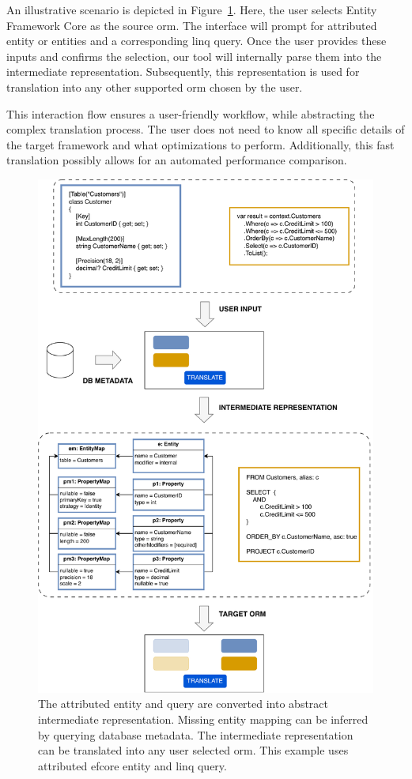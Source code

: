 An illustrative scenario is depicted in Figure~\ref{fig:orm_to_abstract}. Here, the user selects Entity Framework Core as the source \acrshort{orm}. The interface will prompt for attributed entity or entities and a corresponding \acrshort{linq} query. Once the user provides these inputs and confirms the selection, our tool will internally parse them into the intermediate representation. Subsequently, this representation is used for translation into any other supported \acrshort{orm} chosen by the user.

This interaction flow ensures a user-friendly workflow, while abstracting the complex translation process. The user does not need to know all specific details of the target framework and what optimizations to perform. Additionally, this fast translation possibly allows for an automated performance comparison.

\begin{figure}[p]
  \centering
  \includegraphics[width=\textwidth]{thesis/img/thesis/02_user_interaction.drawio.pdf}
  \caption{The attributed entity and query are converted into abstract intermediate representation. Missing entity mapping can be inferred by querying database metadata. The intermediate representation can be translated into any user selected \acrshort{orm}. This example uses attributed \acrshort{efcore} entity and \acrshort{linq} query.}
  \label{fig:orm_to_abstract}
\end{figure}


